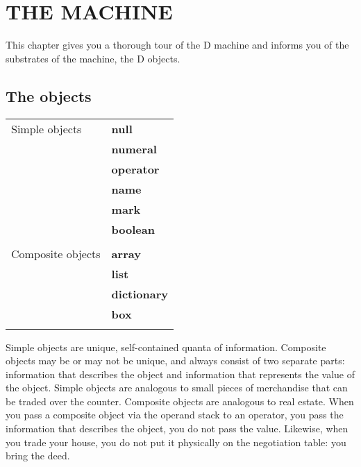 \chapter{THE MACHINE}

This chapter gives you a thorough tour of the D machine and informs you of the substrates of the machine, the D objects.

\section{The objects}

\begin{tabular}{>{\normalfont}l>{\bfseries}l}
Simple objects & null\\    
               & numeral\\ 
               & operator\\
               & name\\
               & mark\\
               & boolean\\\\

Composite objects & array\\
                  & list\\
                  & dictionary\\
                  & box\\\\
\end{tabular}

\noindent Simple  objects  are  unique,   self-contained  quanta  of  information. Composite objects may be or may not be unique,  and always consist of two separate  parts:  information that describes the object  and  information that represents the value of the object.  Simple objects are analogous to small  pieces  of  merchandise  that can  be  traded  over  the  counter. Composite objects are analogous to real estate. When you pass a composite object  via the operand stack to an operator,  you pass  the  information that describes the object,  you do not pass the value. Likewise, when you trade your house,  you do not put it physically on the negotiation table: you bring the deed.

